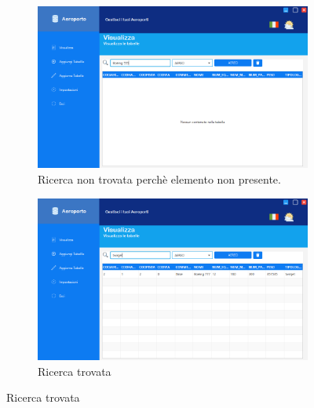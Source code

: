 \begin{figure}[H]
	\begin{subfigure}{.6\textwidth}
		\centering
		\includegraphics[width=1\linewidth]{./img/Applicativo/search_bar3.png}
		\caption{Ricerca non trovata perchè elemento non presente.}
		\label{fig:search_bar3}
	\end{subfigure}%
	\begin{subfigure}{.6\textwidth}
		\centering
		\includegraphics[width=1\linewidth]{./img/Applicativo/search_bar4.png}
		\caption{Ricerca trovata}
		\label{fig:search_bar4}
	\end{subfigure}
	\label{fig:search_bars}
\end{figure}

